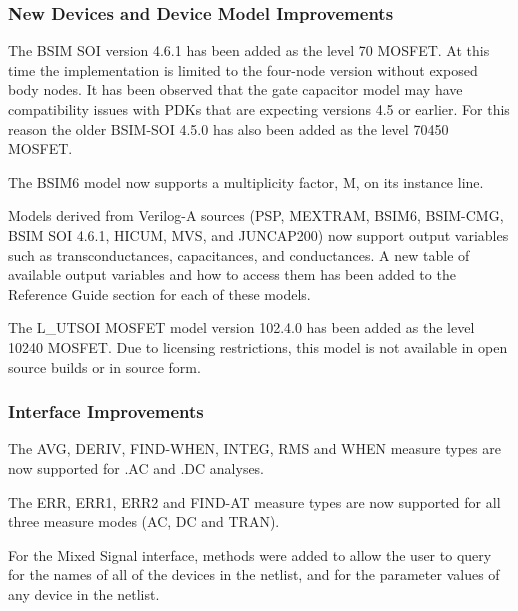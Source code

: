 \documentclass[letterpaper]{scrartcl}
\begin{document}
\subsubsection*{New Devices and Device Model Improvements}
\begin{XyceItemize}
  \item The BSIM SOI version 4.6.1 has been added as the level 70
    MOSFET.  At this time the implementation is limited to the
    four-node version without exposed body nodes.  It has been
    observed that the gate capacitor model may have compatibility
    issues with PDKs that are expecting versions 4.5 or earlier.  For
    this reason the older BSIM-SOI 4.5.0 has also been added as the
    level 70450 MOSFET.
  \item The BSIM6 model now supports a multiplicity factor, M, on its
    instance line.
  \item Models derived from Verilog-A sources (PSP, MEXTRAM, BSIM6,
    BSIM-CMG, BSIM SOI 4.6.1, HICUM, MVS, and JUNCAP200) now support
    output variables such as transconductances, capacitances, and
    conductances.  A new table of available output variables and how
    to access them has been added to the Reference Guide section for
    each of these models.
  \item The L\_UTSOI MOSFET model version 102.4.0 has been added as
    the level 10240 MOSFET.  Due to licensing restrictions, this model is
    not available in open source builds or in source form.
\end{XyceItemize}

\subsubsection*{Interface Improvements}
\begin{XyceItemize}
  \item The AVG, DERIV, FIND-WHEN, INTEG, RMS and WHEN measure types are
now supported for .AC and .DC analyses.
  \item The ERR, ERR1, ERR2 and FIND-AT measure types are now supported
for all three measure modes (AC, DC and TRAN).
  \item For the Mixed Signal interface, methods were added to allow
the user to query for the names of all of the devices in the
netlist, and for the parameter values of any device in the netlist.
\end{XyceItemize}
\end{document}
